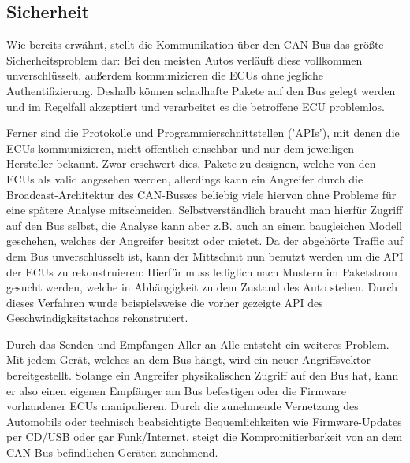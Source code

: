 \documentclass[
    fontsize=12pt,
    headings=small,
    parskip=half,           %
    bibliography=totoc,9
    numbers=noenddot,       %
    open=any,               %
    ]{scrreprt}
\begin{document}
\subsection{Sicherheit}
Wie bereits erwähnt, stellt die Kommunikation über den CAN-Bus das größte Sicherheitsproblem dar: Bei den meisten Autos verläuft diese vollkommen unverschlüsselt, außerdem kommunizieren die ECUs ohne jegliche Authentifizierung. Deshalb können schadhafte Pakete auf den Bus gelegt werden und im Regelfall akzeptiert und verarbeitet es die betroffene ECU problemlos.\par
Ferner sind die Protokolle und Programmierschnittstellen ('APIs'), mit denen die ECUs kommunizieren, nicht öffentlich einsehbar und nur dem jeweiligen Hersteller bekannt. Zwar erschwert dies, Pakete zu designen, welche von den ECUs als valid angesehen werden, allerdings kann ein Angreifer durch die Broadcast-Architektur des CAN-Busses beliebig viele hiervon ohne Probleme für eine spätere Analyse mitschneiden.
Selbstverständlich braucht man hierfür Zugriff auf den Bus selbst, die Analyse kann aber z.B. auch an einem baugleichen Modell geschehen, welches der Angreifer besitzt oder mietet. Da der abgehörte Traffic auf dem Bus unverschlüsselt ist, kann der Mittschnit nun benutzt werden um die API der ECUs zu rekonstruieren: Hierfür muss lediglich nach Mustern im Paketstrom gesucht werden, welche in Abhängigkeit zu dem Zustand des Auto stehen. Durch dieses Verfahren wurde beispielsweise die vorher gezeigte API des Geschwindigkeitstachos rekonstruiert.

Durch das Senden und Empfangen Aller an Alle entsteht ein weiteres Problem. Mit jedem Gerät, welches an dem Bus hängt, wird ein neuer Angriffsvektor bereitgestellt.
Solange ein Angreifer physikalischen Zugriff auf den Bus hat, kann er also einen eigenen Empfänger am Bus befestigen oder die Firmware vorhandener ECUs manipulieren.
Durch die zunehmende Vernetzung des Automobils oder technisch beabsichtigte Bequemlichkeiten wie Firmware-Updates per CD/USB oder gar Funk/Internet, steigt die Kompromitierbarkeit von an dem CAN-Bus befindlichen Geräten zunehmend.

\end{document}

